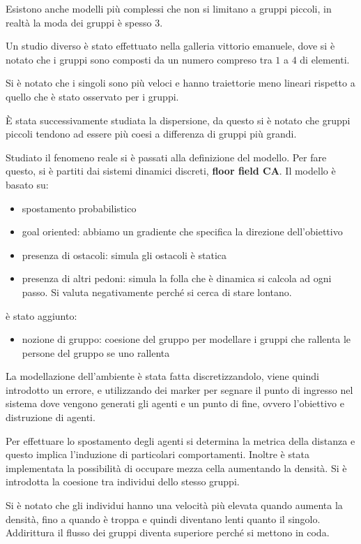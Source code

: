 Esistono anche modelli più complessi che non si limitano a gruppi piccoli, in realtà
la moda dei gruppi è spesso $3$. %

Un studio diverso è stato effettuato nella galleria vittorio emanuele, dove si è
notato che i gruppi sono composti da un numero compreso tra $1$ a $4$ di elementi.

Si è notato che i singoli sono più veloci e hanno traiettorie meno lineari rispetto
a quello che è stato osservato per i gruppi.

È stata successivamente studiata la dispersione, da questo si è notato che gruppi
piccoli tendono ad essere più coesi a differenza di gruppi più grandi.

Studiato il fenomeno reale si è passati alla definizione del modello. Per fare
questo, si è partiti dai sistemi dinamici discreti, \textbf{floor field CA}. Il
modello è basato su:
\begin{itemize}
    \item spostamento probabilistico
    \item goal oriented: abbiamo un gradiente che specifica la direzione dell'obiettivo
    \item presenza di ostacoli: simula gli ostacoli è statica
    \item presenza di altri pedoni: simula la folla che è dinamica si calcola ad
          ogni passo. Si valuta negativamente perché si cerca di stare lontano.
\end{itemize}
è stato aggiunto:
\begin{itemize}
    \item nozione di gruppo: coesione del gruppo per modellare i gruppi che
          rallenta le persone del gruppo se uno rallenta
\end{itemize}
La modellazione dell'ambiente è stata fatta discretizzandolo, viene quindi
introdotto un errore, e utilizzando dei marker per segnare il punto di ingresso
nel sistema  dove vengono generati gli agenti e un punto di fine, ovvero
l'obiettivo e distruzione di agenti.

Per effettuare lo spostamento degli agenti si determina la metrica della distanza
e questo implica l'induzione di particolari comportamenti. Inoltre è stata implementata
la possibilità di occupare mezza cella aumentando la densità. Si è introdotta la
coesione tra individui dello stesso gruppi.

Si è notato che gli individui hanno una velocità più elevata quando aumenta la
densità, fino a quando è troppa e quindi diventano lenti quanto il singolo.
Addirittura il flusso dei gruppi diventa superiore perché si mettono in coda.

